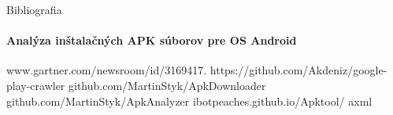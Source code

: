 \documentclass{beamer}
\begin{document}
  \begin{frame}[label=bibliography]{Bibliografia}
    \framesubtitle{Analýza inštalačných APK súborov pre OS Android}
    \begin{thebibliography}{9}
         www.gartner.com/newsroom/id/3169417.
          https://github.com/Akdeniz/google-play-crawler
          github.com/MartinStyk/ApkDownloader
          github.com/MartinStyk/ApkAnalyzer
          ibotpeaches.github.io/Apktool/
          axml
    
    \end{thebibliography}
  \end{frame}
\end{document}
